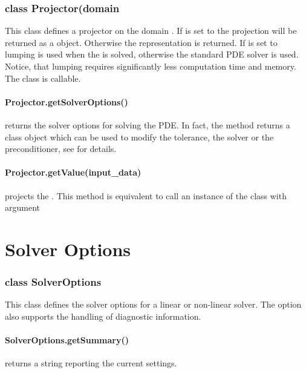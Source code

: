 \subsubsection*{class Projector(domain}
This class defines a projector on the domain .
If  is set to \True the projection will be returned as a
\ReducedSolutionFS \Data object.
Otherwise the \SolutionFS representation is returned.
If  is set to \True lumping is used when the  is
solved, otherwise the standard PDE solver is used.
Notice, that lumping requires significantly less computation time and memory.
The class is callable.


\paragraph{Projector.getSolverOptions()}
returns the solver options for solving the PDE. In fact, the method returns
a \SolverOptions class object which can be used to modify the tolerance,
the solver or the preconditioner, see  for details.


\paragraph{Projector.getValue(input_data)}
projects the . This method is equivalent to call an instance
of the class with argument 


\section{Solver Options}
\label{SEC Solver Options}

\subsubsection*{class SolverOptions}
This class defines the solver options for a linear or non-linear solver.
The option also supports the handling of diagnostic information.


\paragraph{SolverOptions.getSummary()}
returns a string reporting the current settings.


